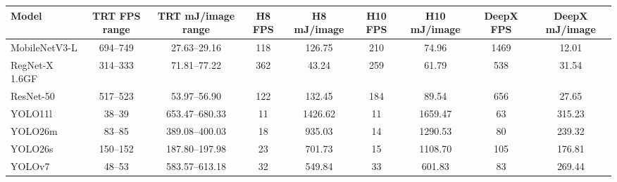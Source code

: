\begin{tabular}{l cc S[table-format=4.0] S[table-format=4.2] S[table-format=4.0] S[table-format=4.2] S[table-format=4.0] S[table-format=4.2]}
\toprule
Model & TRT FPS range & TRT mJ/image range & {H8 FPS} & {H8 mJ/image} & {H10 FPS} & {H10 mJ/image} & {DeepX FPS} & {DeepX mJ/image} \\
\midrule
MobileNetV3-L & 694--749 & 27.63--29.16 & 118 & 126.75 & 210 & 74.96 & 1469 & 12.01 \\
RegNet-X 1.6GF & 314--333 & 71.81--77.22 & 362 & 43.24 & 259 & 61.79 & 538 & 31.54 \\
ResNet-50 & 517--523 & 53.97--56.90 & 122 & 132.45 & 184 & 89.54 & 656 & 27.65 \\
YOLO11l & 38--39 & 653.47--680.33 & 11 & 1426.62 & 11 & 1659.47 & 63 & 315.23 \\
YOLO26m & 83--85 & 389.08--400.03 & 18 & 935.03 & 14 & 1290.53 & 80 & 239.32 \\
YOLO26s & 150--152 & 187.80--197.98 & 23 & 701.73 & 15 & 1108.70 & 105 & 176.81 \\
YOLOv7 & 48--53 & 583.57--613.18 & 32 & 549.84 & 33 & 601.83 & 83 & 269.44 \\
\bottomrule
\end{tabular}
